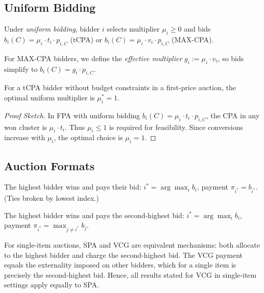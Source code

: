 \subsection{Uniform Bidding}

\begin{definition}
\label{def:uniform-bidding}
Under \emph{uniform bidding}, bidder $i$ selects multiplier $\mu_i \geq 0$ and bids $b_i(C) = \mu_i \cdot t_i \cdot p_{i,C}$ (tCPA) or $b_i(C) = \mu_i \cdot v_i \cdot p_{i,C}$ (MAX-CPA).
\end{definition}

For MAX-CPA bidders, we define the \emph{effective multiplier} $g_i := \mu_i \cdot v_i$, so bids simplify to $b_i(C) = g_i \cdot p_{i,C}$.

\begin{lemma}
\label{lem:optimal-multiplier}
For a tCPA bidder without budget constraints in a first-price auction, the optimal uniform multiplier is $\mu_i^* = 1$.
\end{lemma}

\begin{proof}[Proof Sketch]
In FPA with uniform bidding $b_i(C) = \mu_i \cdot t_i \cdot p_{i,C}$, the CPA in any won cluster is $\mu_i \cdot t_i$. Thus $\mu_i \leq 1$ is required for feasibility. Since conversions increase with $\mu_i$, the optimal choice is $\mu_i = 1$.
\end{proof}

\subsection{Auction Formats}

\begin{definition}
\label{def:fpa}
The highest bidder wins and pays their bid: $i^* = \arg\max_i b_i$, payment $\pi_{i^*} = b_{i^*}$. (Ties broken by lowest index.)
\end{definition}

\begin{definition}
\label{def:spa}
The highest bidder wins and pays the second-highest bid: $i^* = \arg\max_i b_i$, payment $\pi_{i^*} = \max_{j \neq i^*} b_j$.
\end{definition}

\begin{remark}
\label{rem:spa-vcg-equiv}
For single-item auctions, SPA and VCG are equivalent mechanisms: both allocate to the highest bidder and charge the second-highest bid. The VCG payment equals the externality imposed on other bidders, which for a single item is precisely the second-highest bid. Hence, all results stated for VCG in single-item settings apply equally to SPA.
\end{remark}


